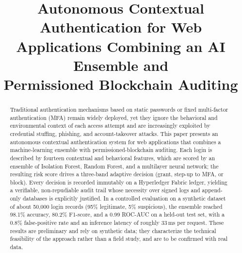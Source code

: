 \documentclass[conference]{IEEEtran}
\begin{document}
\title{Autonomous Contextual Authentication for Web\\ Applications Combining an AI Ensemble and\\ Permissioned Blockchain Auditing}

\author{
\and
{}
}

\maketitle

\begin{abstract}
Traditional authentication mechanisms based on static passwords or
fixed multi-factor authentication (MFA) remain widely deployed, yet
they ignore the behavioral and environmental context of each access
attempt and are increasingly exploited by credential stuffing,
phishing, and account-takeover attacks. This paper presents an
autonomous contextual authentication system for web applications that
combines a machine-learning ensemble with permissioned-blockchain
auditing. Each login is described by fourteen contextual and
behavioral features, which are scored by an ensemble of Isolation
Forest, Random Forest, and a multilayer neural network; the resulting
risk score drives a three-band adaptive decision (grant, step-up to
MFA, or block). Every decision is recorded immutably on a Hyperledger
Fabric ledger, yielding a verifiable, non-repudiable audit trail whose
necessity over signed logs and append-only databases is explicitly
justified. In a controlled evaluation on a synthetic dataset of about
50{,}000 login records (95\% legitimate, 5\% suspicious), the ensemble
reached 98.1\% accuracy, 80.2\% F1-score, and a 0.99 ROC-AUC on a
held-out test set, with a 0.8\% false-positive rate and an inference
latency of roughly 33\,ms per request. These results are preliminary
and rely on synthetic data; they characterize the technical
feasibility of the approach rather than a field study, and are to be
confirmed with real data.
\end{abstract}
\end{document}
